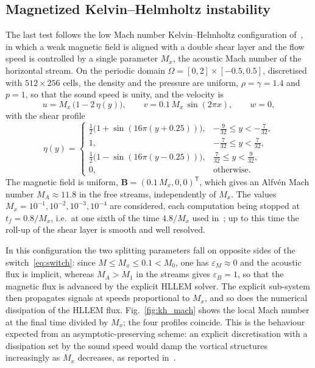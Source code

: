 \documentclass[a4paper,fleqn]{cas-sc}
\theoremstyle{remark}
\newcommand{\eps}{\varepsilon}
\newcommand{\epsM}{\eps_{M}}
\newcommand{\epsB}{\eps_{B}}
\newcommand{\Bb}{\mathbf{B}}
\begin{document}
\subsection{Magnetized Kelvin–Helmholtz instability}
\label{sec:KH}
The last test follows the low Mach number Kelvin--Helmholtz configuration
of~\cite{BoscheriThomann2024}, in which a weak magnetic field is aligned with a
double shear layer and the flow speed is controlled by a single parameter
$M_x$, the acoustic Mach number of the horizontal stream. On the periodic
domain $\Omega=[0,2]\times[-0.5,0.5]$, discretised with $512\times256$ cells,
the density and the pressure are uniform, $\rho=\gamma=1.4$ and $p=1$, so that
the sound speed is unity, and the velocity is
%
\begin{equation}
\label{eq:kh_vel}
u = M_x\,\bigl(1 - 2\,\eta(y)\bigr), \qquad
v = 0.1\,M_x\,\sin(2\pi x), \qquad w=0,
\end{equation}
%
with the shear profile
%
\begin{equation}
\label{eq:kh_eta}
\eta(y) =
\begin{cases}
\tfrac12\bigl(1 + \sin(16\pi(y+0.25))\bigr), & -\tfrac{9}{32} \le y < -\tfrac{7}{32}, \\[4pt]
1, & -\tfrac{7}{32} \le y < \tfrac{7}{32}, \\[4pt]
\tfrac12\bigl(1 - \sin(16\pi(y-0.25))\bigr), & \tfrac{7}{32} \le y < \tfrac{9}{32}, \\[4pt]
0, & \text{otherwise}.
\end{cases}
\end{equation}
%
The magnetic field is uniform, $\Bb=(0.1\,M_x,0,0)^{\mathsf T}$, which gives
an Alfv\'en Mach number $M_A\approx11.8$ in the free streams, independently of
$M_x$. The values $M_x=10^{-1},10^{-2},10^{-3},10^{-4}$ are considered, each
computation being stopped at $t_f=0.8/M_x$, i.e.\ at one sixth of the time
$4.8/M_x$ used in~\cite{BoscheriThomann2024}; up to this time the roll-up of
the shear layer is smooth and well resolved.

In this configuration the two splitting parameters fall on opposite sides of
the switch~\eqref{eq:switch}: since $M\le M_x\le0.1<M_0$, one has
$\epsM\approx0$ and the acoustic flux is implicit, whereas $M_A>M_1$ in the
streams gives $\epsB=1$, so that the magnetic flux is advanced by the explicit
HLLEM solver. The explicit sub-system then propagates signals at speeds
proportional to $M_x$, and so does the numerical dissipation of the HLLEM
flux. Fig.~\ref{fig:kh_mach} shows the local Mach number at the final time
divided by $M_x$; the four profiles coincide. %
This is the behaviour expected from an asymptotic-preserving scheme: an
explicit discretisation with a dissipation set by the sound speed would damp
the vortical structures increasingly as $M_x$ decreases, as reported
in~\cite{BoscheriThomann2024}.
\end{document}
